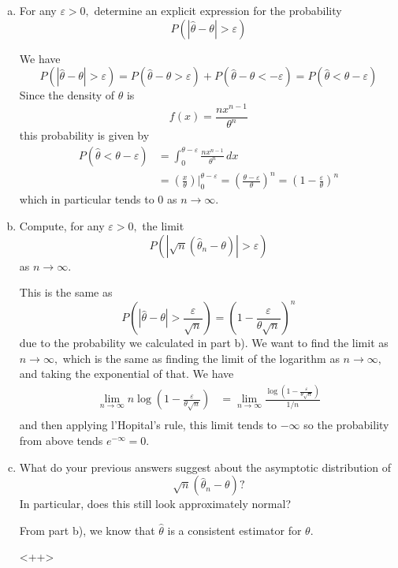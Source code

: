 \documentclass{article}
\begin{document}
\begin{enumerate}
\begin{enumerate}[a)]
\begin{proof}
				\end{proof}

			\item For any $\varepsilon>0,$ determine an explicit expression for the probability \[P\left( |\hat{\theta}-\theta| > \varepsilon \right)\]
				\begin{soln}
					We have \[P(|\hat{\theta}-\theta|>\varepsilon) = P(\hat{\theta}-\theta>\varepsilon)+P(\hat{\theta}-\theta<-\varepsilon)=P(\hat{\theta}<\theta-\varepsilon)\] Since the density of $\hat{\theta}$ is \[f(x)=\frac{nx^{n-1}}{\theta^n}\] this probability is given by
					\begin{align*}
						P(\hat{\theta}<\theta-\varepsilon) &= \int_0^{\theta-\varepsilon} \frac{n x^{n-1}}{\theta^n}\, dx \\
						&= \left( \frac{x}{\theta} \right)\bigg\vert^{\theta-\varepsilon}_0 = \left( \frac{\theta-\varepsilon}{\theta} \right)^n = \left( 1-\frac{\varepsilon}{\theta} \right)^n
					\end{align*} which in particular tends to 0 as $n\to\infty.$

				\end{soln}

			\item Compute, for any $\varepsilon>0,$ the limit \[P\left( |\sqrt{n}(\hat{\theta}_n-\theta)| > \varepsilon \right) \] as $n\to\infty.$
				\begin{soln}
					This is the same as \[P\left( |\hat{\theta}-\theta| > \frac{\varepsilon}{\sqrt{n}} \right)=\left( 1-\frac{\varepsilon}{\theta\sqrt{n}} \right)^n\] due to the probability we calculated in part b). We want to find the limit as $n\to\infty,$ which is the same as finding the limit of the logarithm as $n\to\infty,$ and taking the exponential of that. We have 
					\begin{align*}
						\lim_{n\to\infty} n\log\left( 1-\frac{\varepsilon}{\theta\sqrt{n}} \right) &= \lim_{n\to\infty} \frac{\log\left( 1-\frac{\varepsilon}{\theta\sqrt{n}} \right)}{1/n} \\
					\end{align*} and then applying l'Hopital's rule, this limit tends to $-\infty$ so the probability from above tends $e^{-\infty}=0.$ 
					
				\end{soln}

			\item What do your previous answers suggest about the asymptotic distribution of \[\sqrt{n}(\hat{\theta}_n-\theta)?\] In particular, does this still look approximately normal?
				\begin{soln}
					From part b), we know that $\hat{\theta}$ is a consistent estimator for $\theta.$ 
				\end{soln}<++>
				
		\end{enumerate}
		
\end{enumerate}
\end{document}
